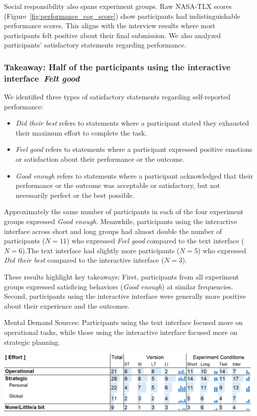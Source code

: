 Social responsibility also spans experiment groups. Raw NASA-TLX scores (Figure~\ref{fig:performance_cog_score}) show participants had indistinguishable performance scores. This aligns with the interview results where most participants felt positive about their final submission. We also analyzed participants' satisfactory statements regarding performance.

\subsubsection{Takeaway: Half of the participants using the interactive interface~\textit{Felt good}}
We identified three types of satisfactory statements regarding self-reported performance:
\begin{itemize}
    \item \textit{Did their best} refers to statements where a participant stated they exhausted their maximum effort to complete the task.
    \item \textit{Feel good} refers to statements where a participant expressed positive emotions or satisfaction about their performance or the outcome.
    \item \textit{Good enough} refers to statements where a participant acknowledged that their performance or the outcome was acceptable or satisfactory, but not necessarily perfect or the best possible.
\end{itemize}

Approximately the same number of participants in each of the four experiment groups expressed \textit{Good enough}. Meanwhile, participants using the interactive interface across short and long groups had almost double the number of participants ($N=11$) who expressed \textit{Feel good} compared to the text interface ($N=6$).The text interface had slightly more participants ($N=5$) who expressed \textit{Did their best} compared to the interactive interface ($N=3$).

These results highlight key takeaways: First, participants from all experiment groups expressed satisficing behaviors (\textit{Good enough}) at similar frequencies. Second, participants using the interactive interface were generally more positive about their experience and the outcomes.



\begin{table}[h]
    \caption{Mental Demand Sources: Participants using the text interface focused more on operational tasks, while those using the interactive interface focused more on strategic planning.}
    \label{tbl:physical}
    \includegraphics[width=\linewidth]{content/image/cog/effort_table.png}
\end{table}

